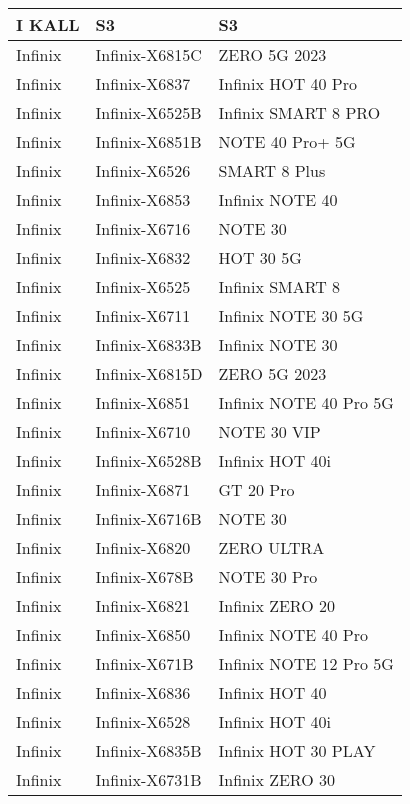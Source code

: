 \begin{tabularx}{\linewidth}{|l|X|X|}
        I KALL & S3 & S3 \\ \hline
        Infinix & Infinix-X6815C & ZERO 5G 2023 \\ \hline
        Infinix & Infinix-X6837 & Infinix HOT 40 Pro \\ \hline
        Infinix & Infinix-X6525B & Infinix SMART 8 PRO \\ \hline
        Infinix & Infinix-X6851B & NOTE 40 Pro+ 5G \\ \hline
        Infinix & Infinix-X6526 & SMART 8 Plus \\ \hline
        Infinix & Infinix-X6853 & Infinix NOTE 40 \\ \hline
        Infinix & Infinix-X6716 & NOTE 30 \\ \hline
        Infinix & Infinix-X6832 & HOT 30 5G \\ \hline
        Infinix & Infinix-X6525 & Infinix SMART 8 \\ \hline
        Infinix & Infinix-X6711 & Infinix NOTE 30 5G \\ \hline
        Infinix & Infinix-X6833B & Infinix NOTE 30 \\ \hline
        Infinix & Infinix-X6815D & ZERO 5G 2023 \\ \hline
        Infinix & Infinix-X6851 & Infinix NOTE 40 Pro 5G \\ \hline
        Infinix & Infinix-X6710 & NOTE 30 VIP \\ \hline
        Infinix & Infinix-X6528B & Infinix HOT 40i \\ \hline
        Infinix & Infinix-X6871 & GT 20 Pro \\ \hline
        Infinix & Infinix-X6716B & NOTE 30 \\ \hline
        Infinix & Infinix-X6820 & ZERO ULTRA \\ \hline
        Infinix & Infinix-X678B & NOTE 30 Pro \\ \hline
        Infinix & Infinix-X6821 & Infinix ZERO 20 \\ \hline
        Infinix & Infinix-X6850 & Infinix NOTE 40 Pro \\ \hline
        Infinix & Infinix-X671B & Infinix NOTE 12 Pro 5G \\ \hline
        Infinix & Infinix-X6836 & Infinix HOT 40 \\ \hline
        Infinix & Infinix-X6528 & Infinix HOT 40i \\ \hline
        Infinix & Infinix-X6835B & Infinix HOT 30 PLAY \\ \hline
        Infinix & Infinix-X6731B & Infinix ZERO 30 \\ \hline

\end{tabularx}
